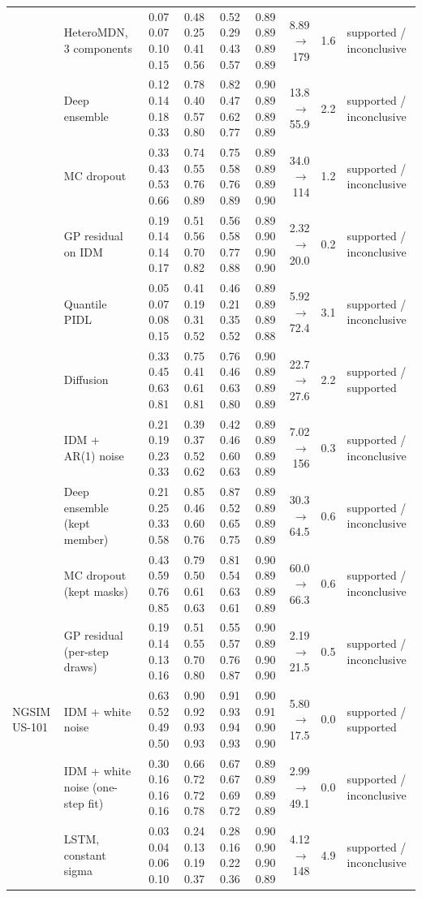 \begin{longtable}{llrrrrrrl}
 & HeteroMDN, 3 components & 0.07 0.07 0.10 0.15 & 0.48 0.25 0.41 0.56 & 0.52 0.29 0.43 0.57 & 0.89 0.89 0.89 0.89 & 8.89 $\rightarrow$ 179 & 1.6 & supported / inconclusive \\
 & Deep ensemble & 0.12 0.14 0.18 0.33 & 0.78 0.40 0.57 0.80 & 0.82 0.47 0.62 0.77 & 0.90 0.89 0.89 0.89 & 13.8 $\rightarrow$ 55.9 & 2.2 & supported / inconclusive \\
 & MC dropout & 0.33 0.43 0.53 0.66 & 0.74 0.55 0.76 0.89 & 0.75 0.58 0.76 0.89 & 0.89 0.89 0.89 0.90 & 34.0 $\rightarrow$ 114 & 1.2 & supported / inconclusive \\
 & GP residual on IDM & 0.19 0.14 0.14 0.17 & 0.51 0.56 0.70 0.82 & 0.56 0.58 0.77 0.88 & 0.89 0.90 0.90 0.90 & 2.32 $\rightarrow$ 20.0 & 0.2 & supported / inconclusive \\
 & Quantile PIDL & 0.05 0.07 0.08 0.15 & 0.41 0.19 0.31 0.52 & 0.46 0.21 0.35 0.52 & 0.89 0.89 0.89 0.88 & 5.92 $\rightarrow$ 72.4 & 3.1 & supported / inconclusive \\
 & Diffusion & 0.33 0.45 0.63 0.81 & 0.75 0.41 0.61 0.81 & 0.76 0.46 0.63 0.80 & 0.90 0.89 0.89 0.89 & 22.7 $\rightarrow$ 27.6 & 2.2 & supported / supported \\
 & IDM + AR(1) noise & 0.21 0.19 0.23 0.33 & 0.39 0.37 0.52 0.62 & 0.42 0.46 0.60 0.63 & 0.89 0.89 0.89 0.89 & 7.02 $\rightarrow$ 156 & 0.3 & supported / inconclusive \\
 & Deep ensemble (kept member) & 0.21 0.25 0.33 0.58 & 0.85 0.46 0.60 0.76 & 0.87 0.52 0.65 0.75 & 0.89 0.89 0.89 0.89 & 30.3 $\rightarrow$ 64.5 & 0.6 & supported / inconclusive \\
 & MC dropout (kept masks) & 0.43 0.59 0.76 0.85 & 0.79 0.50 0.61 0.63 & 0.81 0.54 0.63 0.61 & 0.90 0.89 0.89 0.89 & 60.0 $\rightarrow$ 66.3 & 0.6 & supported / inconclusive \\
 & GP residual (per-step draws) & 0.19 0.14 0.13 0.16 & 0.51 0.55 0.70 0.80 & 0.55 0.57 0.76 0.87 & 0.90 0.89 0.90 0.90 & 2.19 $\rightarrow$ 21.5 & 0.5 & supported / inconclusive \\
\midrule
NGSIM US-101 & IDM + white noise & 0.63 0.52 0.49 0.50 & 0.90 0.92 0.93 0.93 & 0.91 0.93 0.94 0.93 & 0.90 0.91 0.90 0.90 & 5.80 $\rightarrow$ 17.5 & 0.0 & supported / supported \\
 & IDM + white noise (one-step fit) & 0.30 0.16 0.16 0.16 & 0.66 0.72 0.72 0.78 & 0.67 0.67 0.69 0.72 & 0.89 0.89 0.89 0.89 & 2.99 $\rightarrow$ 49.1 & 0.0 & supported / inconclusive \\
 & LSTM, constant sigma & 0.03 0.04 0.06 0.10 & 0.24 0.13 0.19 0.37 & 0.28 0.16 0.22 0.36 & 0.90 0.90 0.90 0.89 & 4.12 $\rightarrow$ 148 & 4.9 & supported / inconclusive \\

\end{longtable}
